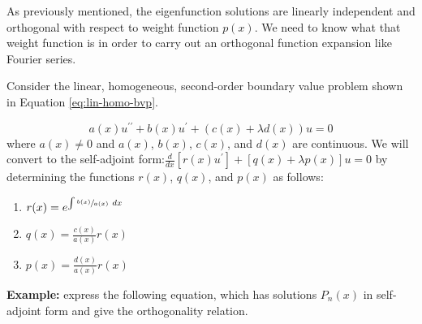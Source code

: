 As previously mentioned, the eigenfunction solutions are linearly independent and orthogonal with respect to weight function $p(x)$.  We need to know what that weight function is in order to carry out an orthogonal function expansion like Fourier series.  

Consider the linear, homogeneous, second-order boundary value problem shown in Equation \ref{eq:lin-homo-bvp}.

\begin{equation}
a(x)u^{\prime \prime} + b(x)u^{\prime} + (c(x) + \lambda d(x))u = 0
\label{eq:lin-homo-bvp}
\end{equation}
where $a(x) \ne 0$ and $a(x)$, $b(x)$, $c(x)$, and $d(x)$ are continuous.  We will convert to the self-adjoint form:$\frac{d}{dx}\left[r(x)u^{\prime}\right]+[q(x)+\lambda p(x)]u =0$ by determining the functions $r(x)$, $q(x)$, and $p(x)$ as follows:
\begin{enumerate}
\item $r(x) = e^{\int \sfrac{b(x)}{a(x)} \ dx}$
\item $q(x) = \frac{c(x)}{a(x)}r(x)$
\item $p(x) = \frac{d(x)}{a(x)}r(x)$
\end{enumerate}

\vspace{0.5cm}

\noindent\textbf{Example:} express the following equation, which has solutions $P_n(x)$ in self-adjoint form and give the orthogonality relation.

